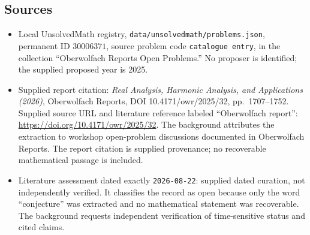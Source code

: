 \documentclass[11pt]{article}
\begin{document}
\subsection{Sources}
\begin{itemize}
\item Local UnsolvedMath registry, \texttt{data/unsolvedmath/problems.json}, permanent ID \(30006371\), source problem code \texttt{catalogue entry}, in the collection ``Oberwolfach Reports Open Problems.'' No proposer is identified; the supplied proposed year is 2025.
\item Supplied report citation: \emph{Real Analysis, Harmonic Analysis, and Applications (2026)}, Oberwolfach Reports, DOI 10.4171/owr/2025/32, pp.\ 1707--1752. Supplied source URL and literature reference labeled ``Oberwolfach report'': \url{https://doi.org/10.4171/owr/2025/32}. The background attributes the extraction to workshop open-problem discussions documented in Oberwolfach Reports. The report citation is supplied provenance; no recoverable mathematical passage is included.
\item Literature assessment dated exactly \texttt{2026-08-22}: supplied dated curation, not independently verified. It classifies the record as open because only the word ``conjecture'' was extracted and no mathematical statement was recoverable. The background requests independent verification of time-sensitive status and cited claims.
\end{itemize}
\end{document}
